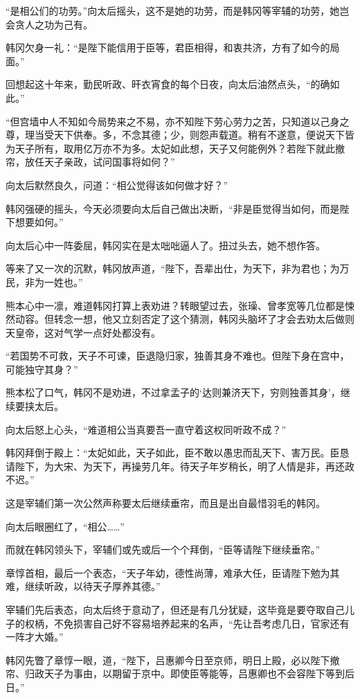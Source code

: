 “是相公们的功劳。”向太后摇头，这不是她的功劳，而是韩冈等宰辅的功劳，她岂会贪人之功为己有。

韩冈欠身一礼：“是陛下能信用于臣等，君臣相得，和衷共济，方有了如今的局面。”

回想起这十年来，勤民听政、旰衣宵食的每个日夜，向太后油然点头，“的确如此。”

“但宫墙中人不知如今局势来之不易，亦不知陛下劳心劳力之苦，只知道以己身之尊，理当受天下供奉。多，不念其德；少，则怨声载道。稍有不遂意，便说天下皆为天子所有，取用亿万亦不为多。太妃如此想，天子又何能例外？若陛下就此撤帘，放任天子亲政，试问国事将如何？”

向太后默然良久，问道：“相公觉得该如何做才好？”

韩冈强硬的摇头，今天必须要向太后自己做出决断，“非是臣觉得当如何，而是陛下想要如何。”

向太后心中一阵委屈，韩冈实在是太咄咄逼人了。扭过头去，她不想作答。

等来了又一次的沉默，韩冈放声道，“陛下，吾辈出仕，为天下，非为君也；为万民，非为一姓也。”

熊本心中一凛，难道韩冈打算上表劝进？转眼望过去，张璪、曾孝宽等几位都是悚然动容。但转念一想，他又立刻否定了这个猜测，韩冈头脑坏了才会去劝太后做则天皇帝，这对气学一点好处都没有。

“若国势不可救，天子不可谏，臣退隐归家，独善其身不难也。但陛下身在宫中，可能独守其身？”

熊本松了口气，韩冈不是劝进，不过拿孟子的‘达则兼济天下，穷则独善其身’，继续要挟太后。

向太后怒上心头，“难道相公当真要吾一直守着这权同听政不成？”

韩冈拜倒于殿上：“太妃如此，天子如此，臣不敢以愚忠而乱天下、害万民。臣恳请陛下，为大宋、为天下，再操劳几年。待天子年岁稍长，明了人情是非，再还政不迟。”

这是宰辅们第一次公然声称要太后继续垂帘，而且是出自最惜羽毛的韩冈。

向太后眼圈红了，“相公……”

而就在韩冈领头下，宰辅们或先或后一个个拜倒，“臣等请陛下继续垂帘。”

章惇首相，最后一个表态，“天子年幼，德性尚薄，难承大任，臣请陛下勉为其难，继续听政，以待天子厚养其德。”

宰辅们先后表态，向太后终于意动了，但还是有几分犹疑，这毕竟是要夺取自己儿子的权柄，不免损害自己好不容易培养起来的名声，“先让吾考虑几日，官家还有一阵才大婚。”

韩冈先瞥了章惇一眼，道，“陛下，吕惠卿今日至京师，明日上殿，必以陛下撤帘、归政天子为事由，以期留于京中。即使臣等能等，吕惠卿也不会容陛下等到后日。”

